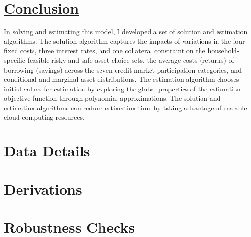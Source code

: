 \documentclass[12pt,english]{article}
\begin{document}
\section{\href{https://papers.ssrn.com/sol3/papers.cfm?abstract_id=3316939}{Conclusion}}

In solving and estimating this model, I developed a set of solution and estimation algorithms. The solution algorithm captures the impacts of variations in the four fixed costs, three interest rates, and one collateral constraint on the household-specific feasible risky and safe asset choice sets, the average costs (returns) of borrowing (savings) across the seven credit market participation categories, and conditional and marginal asset distributions. The estimation algorithm chooses initial values for estimation by exploring the global properties of the estimation objective function through polynomial approximations. The solution and estimation algorithms can reduce estimation time by taking advantage of scalable cloud computing resources.

\pagebreak
\begingroup
{}
\setlength\bibitemsep{0pt}
\printbibliography
\endgroup
\pagebreak


\appendix

\setcounter{page}{1}

\section{Data Details\label{app:data}}
\blindtext
\section{Derivations}
\blindtext
\section{Robustness Checks}
\Blindtext
\pagebreak
\clearpage

\setcounter{section}{0}
\renewcommand{\thesection}{\arabic{section}}
\setcounter{page}{1}
\end{document}
